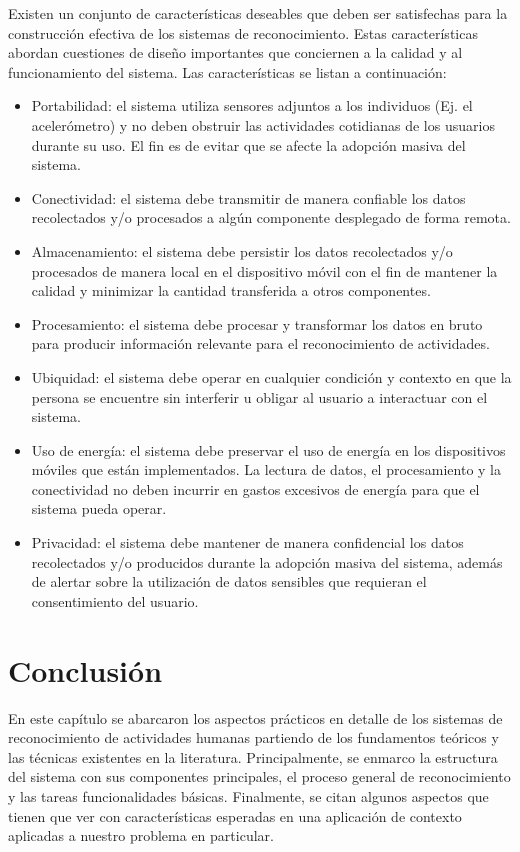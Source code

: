 \label{ssec46:caracteristicas}Existen un conjunto de características
deseables que deben ser satisfechas para la construcción efectiva
de los sistemas de reconocimiento. Estas características abordan cuestiones
de diseño importantes que conciernen a la calidad y al funcionamiento
del sistema. Las características se listan a continuación:
\begin{itemize}
\item Portabilidad: el sistema utiliza sensores adjuntos a los individuos
(Ej. el acelerómetro) y no deben obstruir las actividades cotidianas
de los usuarios durante su uso. El fin es de evitar que se afecte
la adopción masiva del sistema. 
\item Conectividad: el sistema debe transmitir de manera confiable los datos
recolectados y/o procesados a algún componente desplegado de forma
remota. 
\item Almacenamiento: el sistema debe persistir los datos recolectados y/o
procesados de manera local en el dispositivo móvil con el fin de mantener
la calidad y minimizar la cantidad transferida a otros componentes.
\item Procesamiento: el sistema debe procesar y transformar los datos en
bruto para producir información relevante para el reconocimiento de
actividades.
\item Ubiquidad: el sistema debe operar en cualquier condición y contexto
en que la persona se encuentre sin interferir u obligar al usuario
a interactuar con el sistema.
\item Uso de energía: el sistema debe preservar el uso de energía en los
dispositivos móviles que están implementados. La lectura de datos,
el procesamiento y la conectividad no deben incurrir en gastos excesivos
de energía para que el sistema pueda operar.
\item Privacidad: el sistema debe mantener de manera confidencial los datos
recolectados y/o producidos durante la adopción masiva del sistema,
además de alertar sobre la utilización de datos sensibles que requieran
el consentimiento del usuario.
\end{itemize}

\section{Conclusión}

En este capítulo se abarcaron los aspectos prácticos en detalle de
los sistemas de reconocimiento de actividades humanas partiendo de
los fundamentos teóricos y las técnicas existentes en la literatura.
Principalmente, se enmarco la estructura del sistema  con
sus componentes principales, el proceso general de reconocimiento
y las tareas funcionalidades básicas. Finalmente, se citan algunos
aspectos que tienen que ver con características esperadas en una aplicación
de contexto aplicadas a nuestro problema en particular.
